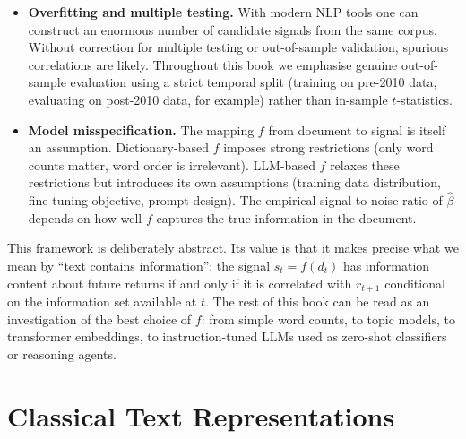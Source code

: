 \begin{context}
\begin{remark}
\begin{itemize}
  \item \textbf{Overfitting and multiple testing.} With modern NLP tools one can
    construct an enormous number of candidate signals from the same corpus.  Without
    correction for multiple testing or out-of-sample validation, spurious correlations
    are likely.  Throughout this book we emphasise genuine out-of-sample evaluation
    using a strict temporal split (training on pre-2010 data, evaluating on post-2010
    data, for example) rather than in-sample $t$-statistics.

  \item \textbf{Model misspecification.} The mapping $f$ from document to signal is
    itself an assumption.  Dictionary-based $f$ imposes strong restrictions (only word
    counts matter, word order is irrelevant).  LLM-based $f$ relaxes these restrictions
    but introduces its own assumptions (training data distribution, fine-tuning
    objective, prompt design).  The empirical signal-to-noise ratio of $\hat{\beta}$
    depends on how well $f$ captures the true information in the document.
\end{itemize}
\end{remark}

This framework is deliberately abstract.  Its value is that it makes precise what we
mean by ``text contains information'': the signal $s_t = f(d_t)$ has information content
about future returns if and only if it is correlated with $r_{t+1}$ conditional on the
information set available at $t$.  The rest of this book can be read as an investigation
of the best choice of $f$: from simple word counts, to topic models, to transformer
embeddings, to instruction-tuned LLMs used as zero-shot classifiers or reasoning agents.

\end{context}

\section{Classical Text Representations}
\label{sec:classical}

